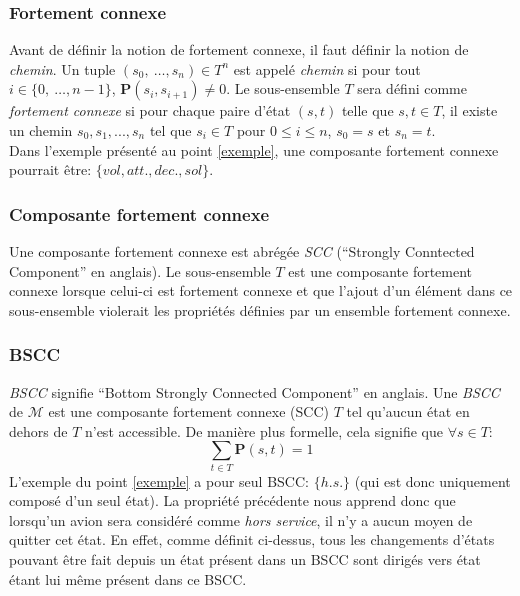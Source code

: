 \documentclass[letterpaper]{article}
\begin{document}
    \subsubsection{Fortement connexe}
      Avant de définir la notion de fortement connexe, il faut définir la
      notion de \textit{chemin}.  Un tuple $(s_0,~\ldots, s_n) \in T^n$ est
      appelé \textit{chemin} si pour tout $i \in \{0,~\ldots, n-1\}$, 
      $\mathbf P(s_i, s_{i+1}) \neq 0$.
      Le sous-ensemble $T$ sera défini comme \textit{fortement connexe} si
      pour chaque paire d'état $(s, t)$ telle que $s, t \in T$, il existe un
      chemin $s_0, s_1, ..., s_n$ tel que $s_i \in T$ pour $0 \leq i \leq n$,
      $s_0 = s$ et $s_n = t$.\\
      Dans l'exemple présenté au point \ref{exemple}, une composante fortement
      connexe pourrait être: $\{vol, att., dec., sol\}$.

    \subsubsection{Composante fortement connexe}
      Une composante fortement connexe est abrégée \textit{SCC} (``Strongly
      Conntected Component'' en anglais).  Le sous-ensemble $T$ est une
      composante fortement connexe lorsque celui-ci est fortement connexe et
      que l'ajout d'un élément dans ce sous-ensemble violerait les propriétés
      définies par un ensemble fortement connexe.

    \subsubsection{BSCC}
      \label{bscc}
      \textit{BSCC} signifie ``Bottom Strongly Connected Component'' en anglais.
      Une \textit{BSCC} de $\mathcal{M}$ est une composante fortement connexe
      (SCC) $T$ tel qu'aucun état en dehors de $T$ n'est accessible.  De manière
      plus formelle, cela signifie que $\forall s \in T$:
      $$\sum\limits_{t \in T} \mathbf{P}(s, t) = 1$$
      L'exemple du point \ref{exemple} a pour seul BSCC: $\{h.s.\}$ (qui
      est donc uniquement composé d'un seul état).
      La propriété précédente nous apprend donc que lorsqu'un avion sera
      considéré comme \textit{hors service}, il n'y a aucun moyen de quitter
      cet état.  En effet, comme définit ci-dessus, tous les changements
      d'états pouvant être fait depuis un état présent dans un BSCC sont dirigés
      vers état étant lui même présent dans ce BSCC.
\end{document}
